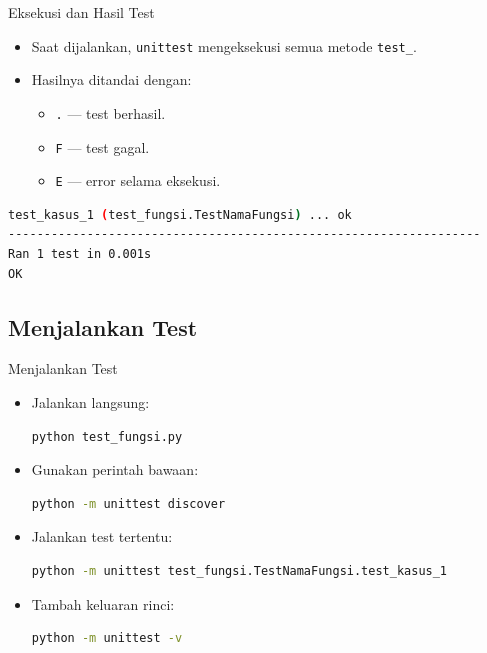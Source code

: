 \documentclass[aspectratio=169, table]{beamer}
\begin{document}
\begin{frame}[fragile]{Eksekusi dan Hasil Test}
\vspace*{10pt}
\begin{itemize}
  \item Saat dijalankan, \texttt{unittest} mengeksekusi semua metode \texttt{test\_}.
  \item Hasilnya ditandai dengan:
  \begin{itemize}
    \item \texttt{.} — test berhasil.
    \item \texttt{F} — test gagal.
    \item \texttt{E} — error selama eksekusi.
  \end{itemize}
\end{itemize}

\begin{lstlisting}[language=bash]
test_kasus_1 (test_fungsi.TestNamaFungsi) ... ok
------------------------------------------------------------------
Ran 1 test in 0.001s
OK
\end{lstlisting}
\end{frame}

\subsection{Menjalankan Test}
\begin{frame}[fragile]{Menjalankan Test}
\vspace*{10pt}
\begin{itemize}
  \item Jalankan langsung:
  \begin{lstlisting}[language=bash]
  python test_fungsi.py
  \end{lstlisting}
  \item Gunakan perintah bawaan:
  \begin{lstlisting}[language=bash]
  python -m unittest discover
  \end{lstlisting}
  \item Jalankan test tertentu:
  \begin{lstlisting}[language=bash]
  python -m unittest test_fungsi.TestNamaFungsi.test_kasus_1
  \end{lstlisting}
  \item Tambah keluaran rinci:
  \begin{lstlisting}[language=bash]
  python -m unittest -v
  \end{lstlisting}
\end{itemize}
\end{frame}
\end{document}
